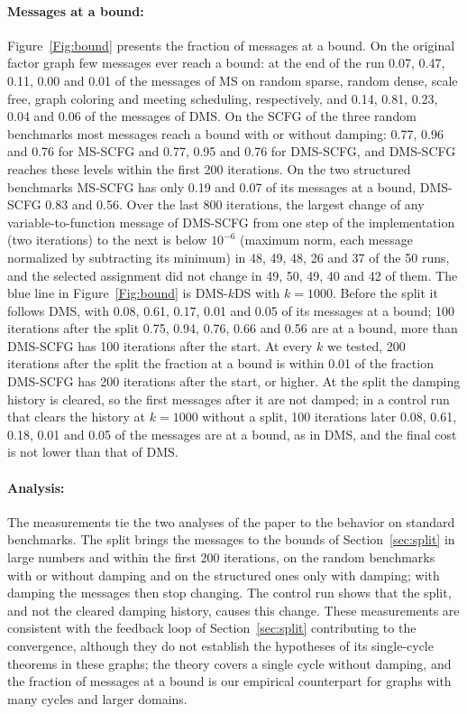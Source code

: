 \paragraph{Messages at a bound:}
Figure~\ref{Fig:bound} presents the fraction of messages at a bound. On the original factor graph few messages ever reach a bound: at the end of the run 0.07, 0.47, 0.11, 0.00 and 0.01 of the messages of MS on random sparse, random dense, scale free, graph coloring and meeting scheduling, respectively, and 0.14, 0.81, 0.23, 0.04 and 0.06 of the messages of DMS. On the SCFG of the three random benchmarks most messages reach a bound with or without damping: 0.77, 0.96 and 0.76 for MS-SCFG and 0.77, 0.95 and 0.76 for DMS-SCFG, and DMS-SCFG reaches these levels within the first 200 iterations. On the two structured benchmarks MS-SCFG has only 0.19 and 0.07 of its messages at a bound, DMS-SCFG 0.83 and 0.56. Over the last 800 iterations, the largest change of any variable-to-function message of DMS-SCFG from one step of the implementation (two iterations) to the next is below $10^{-6}$ (maximum norm, each message normalized by subtracting its minimum) in 48, 49, 48, 26 and 37 of the 50 runs, and the selected assignment did not change in 49, 50, 49, 40 and 42 of them. The blue line in Figure~\ref{Fig:bound} is DMS-$k$DS with $k = 1000$. Before the split it follows DMS, with 0.08, 0.61, 0.17, 0.01 and 0.05 of its messages at a bound; 100 iterations after the split 0.75, 0.94, 0.76, 0.66 and 0.56 are at a bound, more than DMS-SCFG has 100 iterations after the start. At every $k$ we tested, 200 iterations after the split the fraction at a bound is within 0.01 of the fraction DMS-SCFG has 200 iterations after the start, or higher. At the split the damping history is cleared, so the first messages after it are not damped; in a control run that clears the history at $k = 1000$ without a split, 100 iterations later 0.08, 0.61, 0.18, 0.01 and 0.05 of the messages are at a bound, as in DMS, and the final cost is not lower than that of DMS.

\paragraph{Analysis:}
\label{Sec:disc}
The measurements tie the two analyses of the paper to the behavior on standard benchmarks. The split brings the messages to the bounds of Section~\ref{sec:split} in large numbers and within the first 200 iterations, on the random benchmarks with or without damping and on the structured ones only with damping; with damping the messages then stop changing. The control run shows that the split, and not the cleared damping history, causes this change. These measurements are consistent with the feedback loop of Section~\ref{sec:split} contributing to the convergence, although they do not establish the hypotheses of its single-cycle theorems in these graphs; the theory covers a single cycle without damping, and the fraction of messages at a bound is our empirical counterpart for graphs with many cycles and larger domains.


